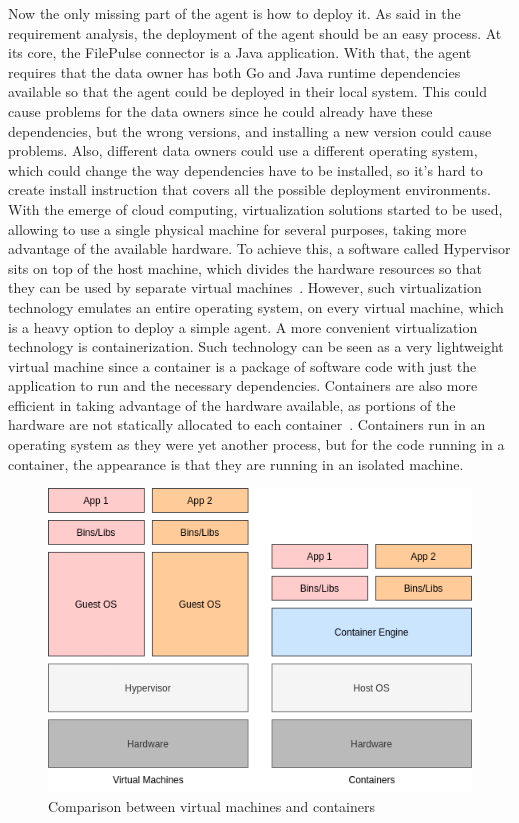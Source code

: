Now the only missing part of the agent is how to deploy it.
As said in the requirement analysis, the deployment of the agent should be an easy process.
At its core, the FilePulse connector is a Java application.
With that, the agent requires that the data owner has both Go and Java runtime dependencies available so that the agent could be deployed in their local system.
This could cause problems for the data owners since he could already have these dependencies, but the wrong versions, and installing a new version could cause problems.
Also, different data owners could use a different operating system, which could change the way dependencies have to be installed, so it's hard to create install instruction that covers all the possible deployment environments.
With the emerge of cloud computing, virtualization solutions started to be used, allowing to use a single physical machine for several purposes, taking more advantage of the available hardware.
To achieve this, a software called Hypervisor sits on top of the host machine, which divides the hardware resources so that they can be used by separate virtual machines~\cite{virtualization}.
However, such virtualization technology emulates an entire operating system, on every virtual machine, which is a heavy option to deploy a simple agent.
A more convenient virtualization technology is containerization.
Such technology can be seen as a very lightweight virtual machine since a container is a package of software code with just the application to run and the necessary dependencies.
Containers are also more efficient in taking advantage of the hardware available, as portions of the hardware are not statically allocated to each container~\cite{containers}.
Containers run in an operating system as they were yet another process, but for the code running in a container, the appearance is that they are running in an isolated machine.

\begin{figure}[H]
    \center
    \includegraphics[width=.6\textwidth]{virtualization}
    \caption{Comparison between virtual machines and containers}
    \label{fig:virtualization}
\end{figure}

